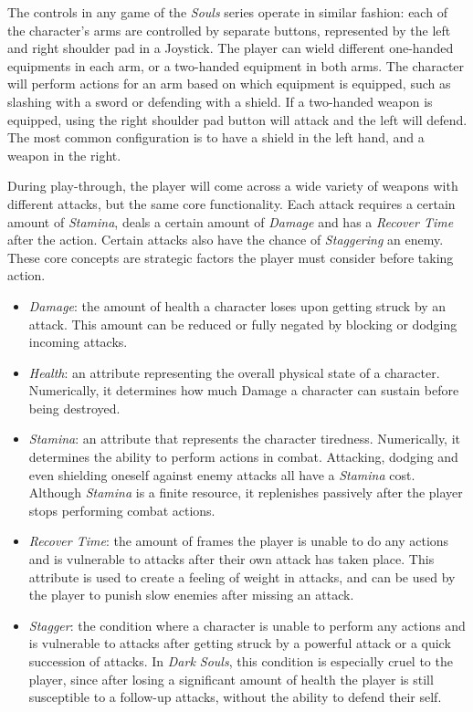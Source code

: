 The controls in any game of the \emph{Souls} series operate in similar fashion: each of the character's arms are controlled by separate buttons, represented by the left and right shoulder pad in a Joystick. The player can wield different one-handed equipments in each arm, or a two-handed equipment in both arms. The character will perform actions for an arm based on which equipment is equipped, such as slashing with a sword or defending with a shield. If a two-handed weapon is equipped, using the right shoulder pad button will attack and the left will defend. The most common configuration is to have a shield in the left hand, and a weapon in the right.

During play-through, the player will come across a wide variety of weapons with different attacks, but the same core functionality. Each attack requires a certain amount of \emph{Stamina}, deals a certain amount of \emph{Damage} and has a \emph{Recover Time} after the action. Certain attacks also have the chance of \emph{Staggering} an enemy. These core concepts are strategic factors the player must consider before taking action. 

\begin{itemize}

\item \emph{Damage}: the amount of health a character loses upon getting struck by an attack. This amount can be reduced or fully negated by blocking or dodging incoming attacks.

\item \emph{Health}: an attribute representing the overall physical state of a character. Numerically, it determines how much Damage a character can sustain before being destroyed.

\item \emph{Stamina}: an attribute that represents the character tiredness. Numerically, it determines the ability to perform actions in combat. Attacking, dodging and even shielding oneself against enemy attacks all have a \emph{Stamina} cost. Although \emph{Stamina} is a finite resource, it replenishes passively after the player stops performing combat actions.

\item \emph{Recover Time}: the amount of frames the player is unable to do any actions and is vulnerable to attacks after their own attack has taken place. This attribute is used to create a feeling of weight in attacks, and can be used by the player to punish slow enemies after missing an attack.

\item \emph{Stagger}: the condition where a character is unable to perform any actions and is vulnerable to attacks after getting struck by a powerful attack or a quick succession of attacks. In \emph{Dark Souls}, this condition is especially cruel to the player, since after losing a significant amount of health the player is still susceptible to a follow-up attacks, without the ability to defend their self.

\end{itemize}

